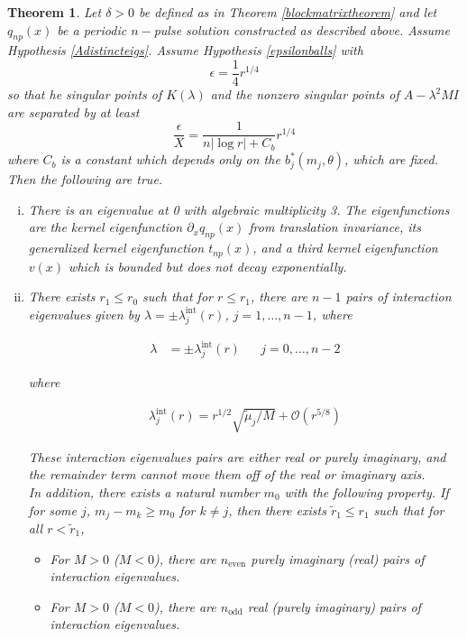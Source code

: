 \documentclass[12pt]{article}
\newtheorem{theorem}{Theorem}
\begin{document}
\begin{theorem}\label{locateeigtheorem}
Let $\delta > 0$ be defined as in Theorem \ref{blockmatrixtheorem} and let $q_{np}(x)$ be a periodic $n-$pulse solution constructed as described above. Assume Hypothesis \ref{Adistincteigs}. Assume Hypothesis \ref{epsilonballs} with
\[
\epsilon = \frac{1}{4}r^{1/4}
\]
so that he singular points of $K(\lambda)$ and the nonzero singular points of $A - \lambda^2 M I$ are separated by at least
\[
\frac{\epsilon}{X} = \frac{1}{n |\log r| + C_b} r^{1/4}
\]
where $C_b$ is a constant which depends only on the $b_j^*(m_j, \theta) $, which are fixed. \\

Then the following are true.

\begin{enumerate}[(i)]

\item There is an eigenvalue at 0 with algebraic multiplicity 3. The eigenfunctions are the kernel eigenfunction $\partial_x q_{np}(x)$ from translation invariance, its generalized kernel eigenfunction $t_{np}(x)$, and a third kernel eigenfunction $v(x)$ which is bounded but does not decay exponentially.

\item There exists $r_1 \leq r_0$ such that for $r \leq r_1$, there are $n - 1$ pairs of interaction eigenvalues given by $\lambda = \pm \lambda^{\text{int}}_j(r)$, $j = 1, \dots, n-1$, where

\begin{align*}
\lambda &= \pm \lambda^{\text{int}}_j(r) && j = 0, \dots, n-2
\end{align*}

where

\begin{align*}
\lambda^{\text{int}}_j(r) = r^{1/2} \sqrt{\tilde{\mu}_j / M} + \mathcal{O}(r^{5/8})
\end{align*}

These interaction eigenvalues pairs are either real or purely imaginary, and the remainder term cannot move them off of the real or imaginary axis.\\

In addition, there exists a natural number $m_0$ with the following property. If  for some $j$, $m_j - m_k \geq m_0$ for $k \neq j$, then there exists $\tilde{r}_1 \leq r_1$ such that for all $r < \tilde{r}_1$, 

\begin{itemize}
\item For $M > 0$ ($M < 0$), there are $n_{\text{even}}$ purely imaginary (real) pairs of interaction eigenvalues.
\item For $M > 0$ ($M < 0$), there are $n_{\text{odd}}$ real (purely imaginary) pairs of interaction eigenvalues.
\end{itemize}


\end{enumerate}
\end{theorem}
\end{document}
